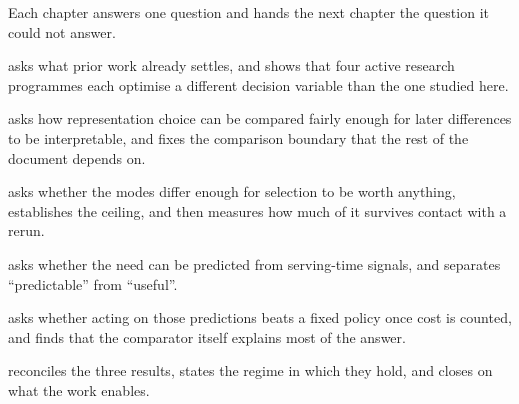 Each chapter answers one question and hands the next chapter the question it
could not answer.

\begin{description}[leftmargin=0em,itemsep=3pt]
\item[Chapter~\ref{ch:bg}] asks what prior work already settles, and shows that
  four active research programmes each optimise a different decision variable
  than the one studied here.
\item[Chapter~\ref{ch:system}] asks how representation choice can be compared
  fairly enough for later differences to be interpretable, and fixes the
  comparison boundary that the rest of the document depends on.
\item[Chapter~\ref{ch:repr}] asks whether the modes differ enough for selection
  to be worth anything, establishes the ceiling, and then measures how much of
  it survives contact with a rerun.
\item[Chapter~\ref{ch:pred}] asks whether the need can be predicted from
  serving-time signals, and separates ``predictable'' from ``useful''.
\item[Chapter~\ref{ch:e2e}] asks whether acting on those predictions beats a
  fixed policy once cost is counted, and finds that the comparator itself
  explains most of the answer.
\item[Chapter~\ref{ch:disc}] reconciles the three results, states the regime in
  which they hold, and closes on what the work enables.
\end{description}

